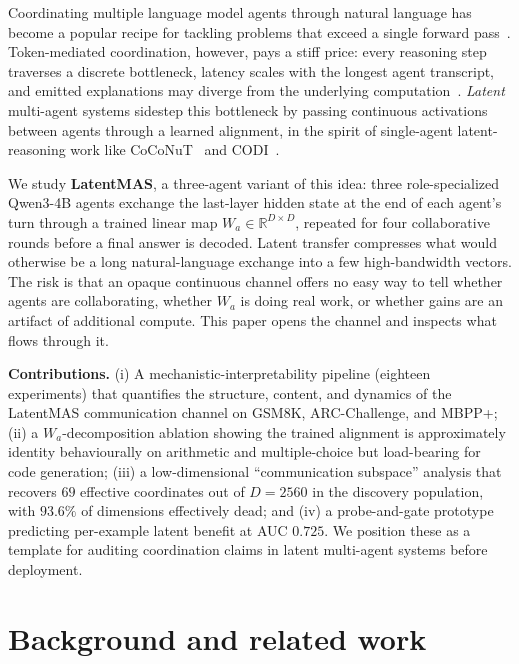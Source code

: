 \documentclass{article}
\begin{document}
Coordinating multiple language model agents through natural language has become a popular recipe for tackling problems that exceed a single forward pass~\citep{du2023improving,liang2023encouraging,wang2023unleashing}. Token-mediated coordination, however, pays a stiff price: every reasoning step traverses a discrete bottleneck, latency scales with the longest agent transcript, and emitted explanations may diverge from the underlying computation~\citep{turpin2023language,lyu2023faithful}. \emph{Latent} multi-agent systems sidestep this bottleneck by passing continuous activations between agents through a learned alignment, in the spirit of single-agent latent-reasoning work like CoCoNuT~\citep{hao2024training} and CODI~\citep{shen2024codi}.

We study \textbf{LatentMAS}, a three-agent variant of this idea: three role-specialized Qwen3-4B agents exchange the last-layer hidden state at the end of each agent's turn through a trained linear map $W_a \in \mathbb{R}^{D \times D}$, repeated for four collaborative rounds before a final answer is decoded. Latent transfer compresses what would otherwise be a long natural-language exchange into a few high-bandwidth vectors. The risk is that an opaque continuous channel offers no easy way to tell whether agents are collaborating, whether $W_a$ is doing real work, or whether gains are an artifact of additional compute. This paper opens the channel and inspects what flows through it.

\textbf{Contributions.} (i) A mechanistic-interpretability pipeline (eighteen experiments) that quantifies the structure, content, and dynamics of the LatentMAS communication channel on GSM8K, ARC-Challenge, and MBPP+; (ii) a $W_a$-decomposition ablation showing the trained alignment is approximately identity behaviourally on arithmetic and multiple-choice but load-bearing for code generation; (iii) a low-dimensional ``communication subspace'' analysis that recovers $69$ effective coordinates out of $D{=}2560$ in the discovery population, with $93.6\%$ of dimensions effectively dead; and (iv) a probe-and-gate prototype predicting per-example latent benefit at AUC $0.725$. We position these as a template for auditing coordination claims in latent multi-agent systems before deployment.

\section{Background and related work}
\label{sec:related}
\end{document}
